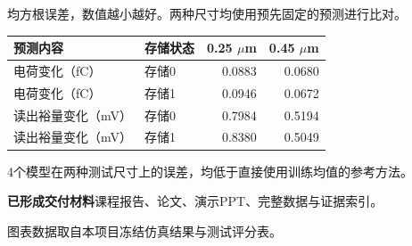 \documentclass[UTF8,fontset=fandol,10pt,a4paper]{ctexart}
\newcommand{\sect}[1]{\par\vspace{9pt}{\large\bfseries #1}\par\vspace{4pt}}
\newcommand{\note}[1]{\par{\footnotesize\color{muted}#1}\par}
\begin{document}
\sect{新尺寸上的预测误差}
\note{均方根误差，数值越小越好。两种尺寸均使用预先固定的预测进行比对。}
\renewcommand{\arraystretch}{1.4}
\begin{tabularx}{\textwidth}{@{}Xlrr@{}}
\toprule
预测内容 & 存储状态 & 0.25 $\mu$m & 0.45 $\mu$m \\
\midrule
电荷变化（fC） & 存储0 & 0.0883 & 0.0680 \\
电荷变化（fC） & 存储1 & 0.0946 & 0.0672 \\
读出裕量变化（mV） & 存储0 & 0.7984 & 0.5194 \\
读出裕量变化（mV） & 存储1 & 0.8380 & 0.5049 \\
\bottomrule
\end{tabularx}\par
\vspace{9pt}
4个模型在两种测试尺寸上的误差，均低于直接使用训练均值的参考方法。

\vfill
\textbf{已形成交付材料}\quad 课程报告、论文、演示PPT、完整数据与证据索引。
\note{图表数据取自本项目冻结仿真结果与测试评分表。}
\end{document}
